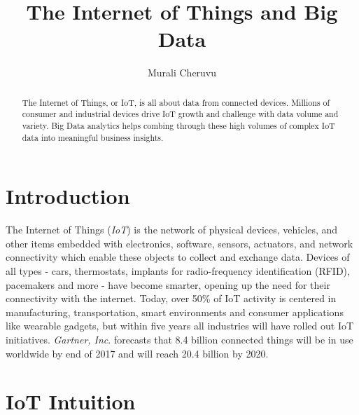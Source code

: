\documentclass[sigconf]{acmart}
\begin{document}
\title{The Internet of Things and Big Data}


\author{Murali Cheruvu}

\renewcommand{\shortauthors}{M. Cheruvu}


\begin{abstract}

The Internet of Things, or IoT, is all about data from connected devices. Millions of consumer and industrial devices drive IoT growth and challenge with data volume and variety. Big Data analytics helps combing through these high volumes of complex IoT data into meaningful business insights.

\end{abstract}



\maketitle

\section{Introduction}

The Internet of Things ({\em IoT}) is the network of physical devices, vehicles, and other items embedded with electronics, software, sensors, actuators, and network connectivity which enable these objects to collect and exchange data\cite{1_wiki_iot}. Devices of all types - cars, thermostats, implants for radio-frequency identification (RFID), pacemakers and more - have become smarter, opening up the need for their connectivity with the internet. Today, over 50\% of IoT activity is centered in manufacturing, transportation, smart environments and consumer applications like wearable gadgets, but within five years all industries will have rolled out IoT initiatives. {\em Gartner, Inc}. forecasts that 8.4 billion connected things will be in use worldwide by end of 2017 and will reach 20.4 billion by 2020\cite{2_Gartner}. 

\section{IoT Intuition}
\end{document}
